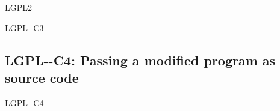 \begin{license}{LGPL2}
\begin{lsuc}{LGPL-\ver-C3}
  \useCaseThree
  \coversThree

  \begin{lsucrequires}
    \lsucmandatory{\keepLicensingElements}
    \lsucmandatory{\lgpltwoEnsureCopyrightNoticeBinary}
    \lsucmandatory{\giveLicense}\passingFilesCorrectly
    \lsucmandatory{\publishUnmodifiedSource}
    \lsucmandatory{\describeHowToGetSource}
    \lsucoptional{\addToDocumentation}
    \lsucoptional{\keepAllCopyrightNotices}
  \end{lsucrequires}

  \lsucprohibitsnothing
\end{lsuc}

\subsection{LGPL-\ver-C4: Passing a modified program as source code}
\begin{lsuc}{LGPL-\ver-C4}
  
  \useCaseFour
  \coversFour

%

  \begin{lsucrequires}
    \lsucmandatory{\keepLicensingElements}
    \lsucmandatory{\lgpltwoEnsureCopyrightNoticeSource}
    \lsucmandatory{\giveLicense}\passingFilesCorrectly
    \lsucmandatory{\markProgramModifications}
    \lsucmandatory{\arrangeProgramChanges}
    \lsucoptional{\createChangelog}
    \lsucoptional{\addToDocumentation}
    \lsucoptional{\keepLicensingElements}
  \end{lsucrequires}
 

\end{lsuc}
\end{license}
